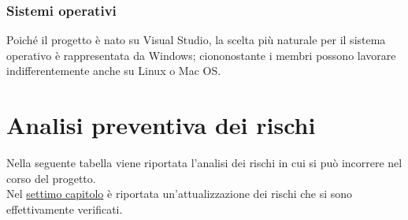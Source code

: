 \subsubsection{Sistemi operativi}
Poiché il progetto è nato su Visual Studio, la scelta più naturale per il sistema operativo è rappresentata da Windows; ciononostante i membri possono lavorare indifferentemente anche su Linux o Mac OS.

\newpage
\section{Analisi preventiva dei rischi}
Nella seguente tabella viene riportata l'analisi dei rischi in cui si può incorrere nel corso del progetto.\\
Nel {\hyperref[cap:conclusioni]{settimo capitolo}}
è riportata un'attualizzazione dei rischi che si sono effettivamente verificati.
